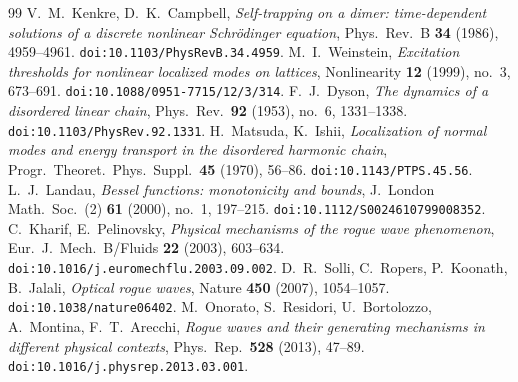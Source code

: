 \documentclass[11pt,reqno]{amsart}
\theoremstyle{plain}
\theoremstyle{definition}
\begin{document}
\begin{thebibliography}{99}
 V.~M.~Kenkre, D.~K.~Campbell, \emph{Self-trapping on a dimer: time-dependent solutions of a discrete nonlinear Schr\"odinger equation}, Phys.\ Rev.\ B \textbf{34} (1986), 4959--4961. \texttt{doi:10.1103/PhysRevB.34.4959}.
 M.~I.~Weinstein, \emph{Excitation thresholds for nonlinear localized modes on lattices}, Nonlinearity \textbf{12} (1999), no.~3, 673--691. \texttt{doi:10.1088/0951-7715/12/3/314}.
 F.~J.~Dyson, \emph{The dynamics of a disordered linear chain}, Phys.\ Rev.\ \textbf{92} (1953), no.~6, 1331--1338. \texttt{doi:10.1103/PhysRev.92.1331}.
 H.~Matsuda, K.~Ishii, \emph{Localization of normal modes and energy transport in the disordered harmonic chain}, Progr.\ Theoret.\ Phys.\ Suppl.\ \textbf{45} (1970), 56--86. \texttt{doi:10.1143/PTPS.45.56}.
 L.~J.~Landau, \emph{Bessel functions: monotonicity and bounds}, J.\ London Math.\ Soc.\ (2) \textbf{61} (2000), no.~1, 197--215. \texttt{doi:10.1112/S0024610799008352}.
 C.~Kharif, E.~Pelinovsky, \emph{Physical mechanisms of the rogue wave phenomenon}, Eur.\ J.\ Mech.\ B/Fluids \textbf{22} (2003), 603--634. \texttt{doi:10.1016/j.euromechflu.2003.09.002}.
 D.~R.~Solli, C.~Ropers, P.~Koonath, B.~Jalali, \emph{Optical rogue waves}, Nature \textbf{450} (2007), 1054--1057. \texttt{doi:10.1038/nature06402}.
 M.~Onorato, S.~Residori, U.~Bortolozzo, A.~Montina, F.~T.~Arecchi, \emph{Rogue waves and their generating mechanisms in different physical contexts}, Phys.\ Rep.\ \textbf{528} (2013), 47--89. \texttt{doi:10.1016/j.physrep.2013.03.001}.
\end{thebibliography}
\end{document}
